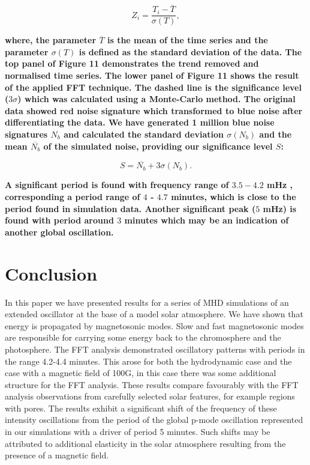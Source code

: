 \documentclass[linenumbers]{aastex63}
\newcommand{\bcr}{\bf\color{red}} %
\begin{document}
\begin{equation}
	Z_{i} = \frac {T_{i} - \overline{T}}  {\sigma(T)},
	\label{z_score}
\end{equation}

{\bcr
where, the parameter $\overline{T}$ is the mean of the time series and the parameter $\sigma(T)$ is defined as the standard deviation of the data. The top panel of Figure 11 demonstrates the trend removed and normalised time series. The lower panel of Figure 11 shows the result of the applied FFT technique. The dashed line is the significance level ($3 \sigma$) which was calculated using a Monte-Carlo method. The original data showed red noise signature which transformed to blue noise after differentiating the data. We have generated 1 million blue noise signatures $N_{b}$ and calculated the standard deviation $\sigma(N_{b})$ and the mean $\overline{N_{b}}$ of the simulated noise, providing our significance level $S$:
}

\begin{equation}
    S = \overline{N_{b}} + 3 \sigma(N_{b}).
\end{equation}

{\bcr
A significant period is found with frequency range of $3.5-4.2$ mHz , corresponding a period range of $4$ - $4.7$ minutes, which is close to the period found in simulation data. Another significant peak ($5$ mHz) is found with period around $3$ minutes which may be an indication of another global oscillation.
}

\section{Conclusion}

In this paper we have presented results for a series of MHD simulations of an extended oscillator at the base of a model solar atmosphere. We have shown that energy is propagated by magnetosonic modes. Slow and fast magnetosonic modes are responsible for carrying some energy back to the chromosphere and the photosphere. 
The FFT analysis demonstrated oscillatory patterns with periods in the range 4.2-4.4 minutes. This arose for both the hydrodynamic case and the case with a magnetic field of 100G, in this case there was some additional structure for the FFT analysis. These results compare favourably with the FFT analysis observations from carefully selected solar features, for example regions with pores. The results exhibit a significant shift of the frequency of these intensity oscillations from the period of the global p-mode oscillation represented in our simulations with a driver of period 5 minutes. Such shifts may be attributed to additional elasticity in the solar atmosphere resulting from the presence of a magnetic field. 
\end{document}
